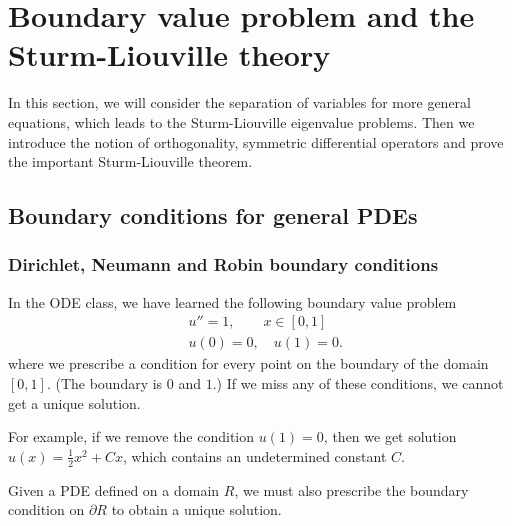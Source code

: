\section{Boundary value problem and the Sturm-Liouville theory}

In this section, we will consider the separation of variables for more general equations, which leads to the Sturm-Liouville eigenvalue problems. Then we introduce the notion of orthogonality, symmetric differential operators and prove the important Sturm-Liouville theorem. 

\subsection{Boundary conditions for general PDEs}


\subsubsection{Dirichlet, Neumann and Robin boundary conditions}

In the ODE class, we have learned the following boundary value problem
\begin{equation}\label{eq.ODE_boundary}
    \begin{split}
        &u'' = 1, \qquad x\in [0, 1]
        \\
        &u(0) = 0,\quad u(1) = 0.
    \end{split}
\end{equation}
where we prescribe a condition for every point on the boundary of the domain $[0, 1]$. (The boundary is $0$ and $1$.) If we miss any of these conditions, we cannot get a unique solution. 

For example, if we remove the condition $u(1) = 0$, then we get solution $u(x) = \frac{1}{2}x^2 + Cx$, which contains an undetermined constant $C$.

Given a PDE defined on a domain $R$, we must also prescribe the boundary condition on $\partial R$ to obtain a unique solution.

